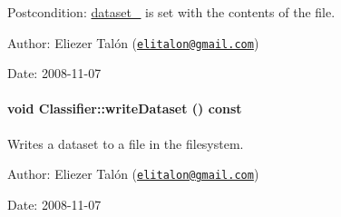 \begin{Desc}
\item[Postcondition:]\hyperlink{class_classifier_ed02e9873fd6e85950ae1e1a6f3d45bf}{dataset\_\-} is set with the contents of the file.\end{Desc}
\begin{Desc}
\item[Author:]Eliezer Talón (\href{mailto:elitalon@gmail.com}{\tt elitalon@gmail.com}) \end{Desc}
\begin{Desc}
\item[Date:]2008-11-07 \end{Desc}
\hypertarget{class_classifier_dcb995d9926d36b71bb8e723422d4974}{
\paragraph[{writeDataset}]{\setlength{\rightskip}{0pt plus 5cm}void Classifier::writeDataset () const}\hfill}
\label{class_classifier_dcb995d9926d36b71bb8e723422d4974}


Writes a dataset to a file in the filesystem. 

\begin{Desc}
\item[Author:]Eliezer Talón (\href{mailto:elitalon@gmail.com}{\tt elitalon@gmail.com}) \end{Desc}
\begin{Desc}
\item[Date:]2008-11-07 \end{Desc}
